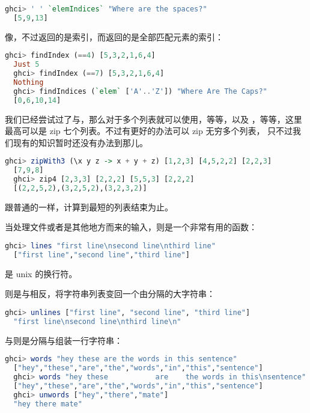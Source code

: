 \documentclass[./main.tex]{subfiles}
\begin{document}
\begin{lstlisting}[language=Haskell]
  ghci> ' ' `elemIndices` "Where are the spaces?"
  [5,9,13]
\end{lstlisting}

像，不过返回的是索引，而返回的是全部匹配元素的索引：

\begin{lstlisting}[language=Haskell]
  ghci> findIndex (==4) [5,3,2,1,6,4]
  Just 5
  ghci> findIndex (==7) [5,3,2,1,6,4]
  Nothing
  ghci> findIndices (`elem` ['A'..'Z']) "Where Are The Caps?"
  [0,6,10,14]
\end{lstlisting}

我们已经尝试过了与，那么对于多个列表就可以使用，等等，以及
，等等，这里最高可以是 zip 七个列表。不过有更好的办法可以 zip 无穷多个列表，
只不过我们现有的知识暂时还没有办法到那儿。

\begin{lstlisting}[language=Haskell]
  ghci> zipWith3 (\x y z -> x + y + z) [1,2,3] [4,5,2,2] [2,2,3]
  [7,9,8]
  ghci> zip4 [2,3,3] [2,2,2] [5,5,3] [2,2,2]
  [(2,2,5,2),(3,2,5,2),(3,2,3,2)]
\end{lstlisting}

跟普通的一样，计算到最短的列表结束为止。

当处理文件或者是其他地方而来的输入，则是一个非常有用的函数：

\begin{lstlisting}[language=Haskell]
  ghci> lines "first line\nsecond line\nthird line"
  ["first line","second line","third line"]
\end{lstlisting}

是 unix 的换行符。

则是与相反，将字符串列表变回一个由分隔的大字符串：

\begin{lstlisting}[language=Haskell]
  ghci> unlines ["first line", "second line", "third line"]
  "first line\nsecond line\nthird line\n"
\end{lstlisting}

与则是分隔与组装一行字符串：

\begin{lstlisting}[language=Haskell]
  ghci> words "hey these are the words in this sentence"
  ["hey","these","are","the","words","in","this","sentence"]
  ghci> words "hey these           are    the words in this\nsentence"
  ["hey","these","are","the","words","in","this","sentence"]
  ghci> unwords ["hey","there","mate"]
  "hey there mate"
\end{lstlisting}
\end{document}

